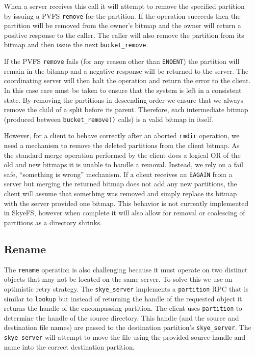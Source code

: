 \documentclass[twocolumn,letterpaper]{article}
\newcommand{\code}[1]{\texttt{#1}}
\begin{document}
When a server receives this call it will attempt to remove the specified
partition by issuing a PVFS \code{remove} for the partition.  If the operation
succeeds then the partition will be removed from the owner's bitmap and the
owner will return a positive response to the caller.  The caller will also
remove the partition from its bitmap and then issue the next
\code{bucket\_\-remove}.

If the PVFS \code{remove} fails (for any reason other than \code{ENOENT}) the
partition will remain in the bitmap and a negative response will be returned
to the server.  The coordinating server will then halt the operation and
return the error to the client.  In this case care must be taken to ensure
that the system is left in a consistent state.  By removing the partitions in
descending order we ensure that we always remove the child of a split before
its parent.  Therefore, each intermediate bitmap (produced between
\code{bucket\_\-remove()} calls) is a valid bitmap in itself.

However, for a client to behave correctly after an aborted \code{rmdir}
operation, we need a mechanism to remove the deleted partitions from the
client bitmap.  As the standard merge operation performed by the client does a
logical OR of the old and new bitmaps it is unable to handle a removal.
Instead, we rely on a fail safe, ``something is wrong'' mechanism.  If a
client receives an \code{EAGAIN} from a server but merging the returned bitmap
does not add any new partitions, the client will assume that something was
removed and simply replace its bitmap with the server provided
one bitmap.  This behavior is not currently implemented in SkyeFS, however
when complete it will also allow for removal or coalescing of partitions as a
directory shrinks.

\subsection{Rename}
The \code{rename} operation is also challenging because it must operate on two
distinct objects that may not be located on the same server.  To solve this we
use an optimistic retry strategy.  The \code{skye\_\-server} implements a
\code{partition} RPC that is similar to \code{lookup} but instead of returning
the handle of the requested object it returns the handle of the encompassing
partition.  The client uses \code{partition} to determine the handle of the
source directory.  This handle (and the source and destination file names)
are passed to the destination partition's \code{skye\_\-server}.  The
\code{skye\_\-server} will attempt to move the file using the provided source
handle and name into the correct destination partition.  
\end{document}
